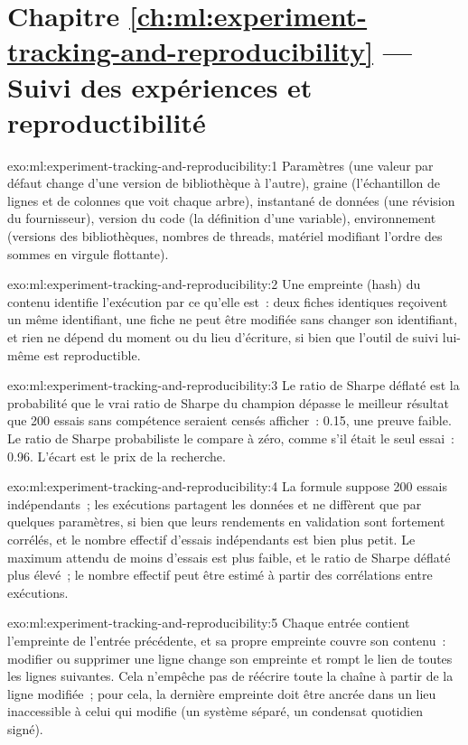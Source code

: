 \section*{Chapitre \ref{ch:ml:experiment-tracking-and-reproducibility} --- Suivi des expériences et reproductibilité}

\begin{solution}{exo:ml:experiment-tracking-and-reproducibility:1}
Paramètres (une valeur par défaut change d'une version de bibliothèque à l'autre), graine (l'échantillon de lignes et de colonnes que voit chaque arbre), instantané de données
(une révision du fournisseur), version du code (la définition d'une variable), environnement (versions des bibliothèques, nombres de threads, matériel
modifiant l'ordre des sommes en virgule flottante).
\end{solution}

\begin{solution}{exo:ml:experiment-tracking-and-reproducibility:2}
Une empreinte (hash) du contenu identifie l'exécution par ce qu'elle est~: deux fiches identiques reçoivent un même identifiant, une fiche ne peut être
modifiée sans changer son identifiant, et rien ne dépend du moment ou du lieu d'écriture, si bien que l'outil de suivi lui-même est reproductible.
\end{solution}

\begin{solution}{exo:ml:experiment-tracking-and-reproducibility:3}
Le ratio de Sharpe déflaté est la probabilité que le vrai ratio de Sharpe du champion dépasse le meilleur résultat que 200
essais sans compétence seraient censés afficher~: 0.15, une preuve faible. Le ratio de Sharpe probabiliste le compare à zéro,
comme s'il était le seul essai~: 0.96. L'écart est le prix de la recherche.
\end{solution}

\begin{solution}{exo:ml:experiment-tracking-and-reproducibility:4}
La formule suppose 200 essais indépendants~; les exécutions partagent les données et ne diffèrent que par quelques paramètres, si bien que leurs rendements en validation sont
fortement corrélés, et le nombre effectif d'essais indépendants est bien plus petit. Le maximum attendu de moins d'essais est
plus faible, et le ratio de Sharpe déflaté plus élevé~; le nombre effectif peut être estimé à partir des corrélations entre exécutions.
\end{solution}

\begin{solution}{exo:ml:experiment-tracking-and-reproducibility:5}
Chaque entrée contient l'empreinte de l'entrée précédente, et sa propre empreinte couvre son contenu~: modifier ou supprimer une ligne change son empreinte
et rompt le lien de toutes les lignes suivantes. Cela n'empêche pas de réécrire toute la chaîne à partir de la ligne modifiée~; pour
cela, la dernière empreinte doit être ancrée dans un lieu inaccessible à celui qui modifie (un système séparé, un condensat quotidien signé).
\end{solution}

